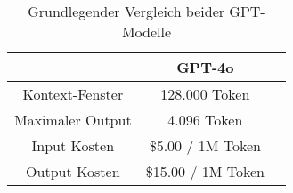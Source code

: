 \bgroup
\def\arraystretch{2}
\begin{table}[!h]
	\vspace{.5cm}
	\begin{center}
		\begin{tabular}{|c||c|c|}
			\hline 
			& GPT-4o \\
			\hline 
			\hline
			Kontext-Fenster & 128.000 Token \\
			\hline
			Maximaler Output & 4.096 Token 
			 \\
			\hline
			Input Kosten & \$5.00 / 1M Token \\
			\hline
			Output Kosten & \$15.00 / 1M Token \\
			\hline
		\end{tabular} 
	\end{center}
	\caption{Grundlegender Vergleich beider GPT-Modelle}
	\label{fig:gpt}
\end{table}
\egroup